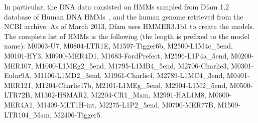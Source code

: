 \documentclass{bmcart}
\begin{document}
In particular, the DNA data consisted on \acp{HMM} sampled
from Dfam 1.2 database of Human DNA \acp{HMM}~\cite{dfam}, and the
human genome retrieved from the NCBI archive.  
As of March 2013, Dfam uses HMMER3.1b1 to create the models. The
complete list of HMMs is the following (the length is
prefixed to the model name): 
%
%
%
M0063-U7,  M0804-LTR1E,  M1597-Tigger6b,  M2500-L1M4c\_5end,
M0101-HY3,  M0900-MER4D1,  M1683-FordPrefect,  M2596-L1P4a\_5end,
M0200-MER107,  M1000-L1MEg2\_5end, M1795-L1MB4\_5end,  M2706-Charlie3,
M0301-Eulor9A,  M1106-L1MD2\_3end,  M1961-Charlie4,  M2789-L1MC4\_3end,
M0401-MER121,  M1204-Charlie17b,  M2101-L1MEg\_5end, M2904-L1M2\_5end,
M0500-LTR72B,  M1302-HSMAR2,  M2204-CR1\_Mam,  M2991-HAL1M8,
M0600-MER4A1,  M1409-MLT1H-int,  M2275-L1P2\_5end,
M0700-MER77B,  M1509-LTR104\_Mam,  M2406-Tigger5.	 						
%
\end{document}
